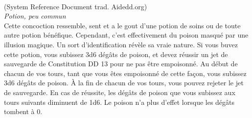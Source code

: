 \\
{\small (System Reference Document trad. Aidedd.org)}\\
{\small \it Potion, peu commun}\\
Cette concoction ressemble, sent et a le gout d'une potion de soins ou de toute autre potion bénéfique. Cependant, c'est effectivement du poison masqué par une illusion magique. Un sort d'identification révèle sa vraie nature.
Si vous buvez cette potion, vous subissez 3d6 dégâts de poison, et devez réussir un jet de sauvegarde de Constitution DD 13 pour ne pas être empoisonné. Au début de chacun de vos tours, tant que vous êtes empoisonné de cette façon, vous subissez 3d6 dégâts de poison. À la fin de chacun de vos tours, vous pouvez rejeter le jet de sauvegarde. En cas de réussite, les dégâts de poison que vous subissez aux tours suivants diminuent de 1d6. Le poison n'a plus d'effet lorsque les dégâts tombent à 0. \\

